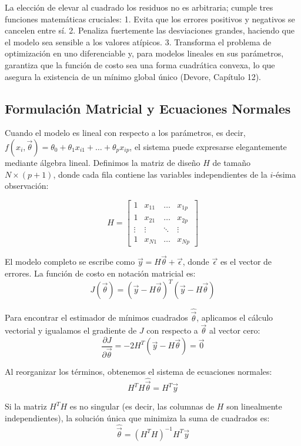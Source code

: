 La elección de elevar al cuadrado los residuos no es arbitraria; cumple tres funciones matemáticas cruciales:
1. Evita que los errores positivos y negativos se cancelen entre sí.
2. Penaliza fuertemente las desviaciones grandes, haciendo que el modelo sea sensible a los valores atípicos.
3. Transforma el problema de optimización en uno diferenciable y, para modelos lineales en sus parámetros, garantiza que la función de costo sea una forma cuadrática convexa, lo que asegura la existencia de un mínimo global único (Devore, Capítulo 12).

\subsection{Formulación Matricial y Ecuaciones Normales}

Cuando el modelo es lineal con respecto a los parámetros, es decir, $f(x_i, \vec{\theta}) = \theta_0 + \theta_1 x_{i1} + \dots + \theta_p x_{ip}$, el sistema puede expresarse elegantemente mediante álgebra lineal. Definimos la matriz de diseño $H$ de tamaño $N \times (p+1)$, donde cada fila contiene las variables independientes de la $i$-ésima observación:

$$ 
H = \begin{bmatrix}
1 & x_{11} & \dots & x_{1p} \\
1 & x_{21} & \dots & x_{2p} \\
\vdots & \vdots & \ddots & \vdots \\
1 & x_{N1} & \dots & x_{Np}
\end{bmatrix} 
$$

El modelo completo se escribe como $\vec{y} = H\vec{\theta} + \vec{\epsilon}$, donde $\vec{\epsilon}$ es el vector de errores. La función de costo en notación matricial es:
$$ J(\vec{\theta}) = (\vec{y} - H\vec{\theta})^T (\vec{y} - H\vec{\theta}) $$

Para encontrar el estimador de mínimos cuadrados $\hat{\vec{\theta}}$, aplicamos el cálculo vectorial y igualamos el gradiente de $J$ con respecto a $\vec{\theta}$ al vector cero:
$$ \frac{\partial J}{\partial \vec{\theta}} = -2 H^T (\vec{y} - H\vec{\theta}) = \vec{0} $$

Al reorganizar los términos, obtenemos el sistema de ecuaciones normales:
$$ H^T H \hat{\vec{\theta}} = H^T \vec{y} $$

Si la matriz $H^T H$ es no singular (es decir, las columnas de $H$ son linealmente independientes), la solución única que minimiza la suma de cuadrados es:
$$ \hat{\vec{\theta}} = (H^T H)^{-1} H^T \vec{y} $$

